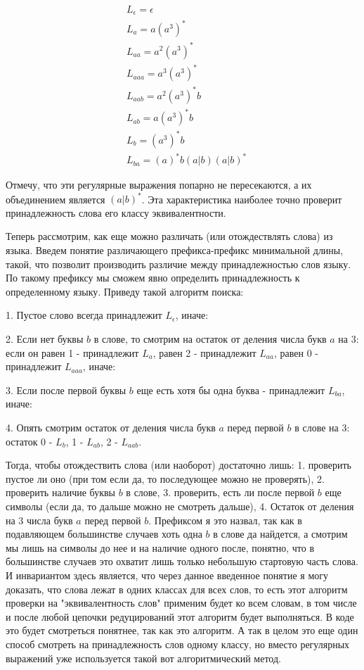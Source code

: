 \documentclass{article}
\begin{document}
\begin{align*}
&L_{\epsilon} = \epsilon \\
&L_a = a(a^3)^* \\
&L_{aa} = a^2(a^3)^* \\
&L_{aaa} = a^3(a^3)^* \\
&L_{aab} = a^2(a^3)^*b \\
&L_{ab} = a(a^3)^*b \\
&L_b = (a^3)^*b \\
&L_{ba} = (a)^*b(a|b)(a|b)^*
\end{align*}

Отмечу, что эти регулярные выражения попарно не пересекаются, а их объединением является $(a|b)^*$. Эта характеристика наиболее точно проверит принадлежность слова его классу эквивалентности.

Теперь рассмотрим, как еще можно различать (или отождествлять слова) из языка. Введем понятие различающего префикса-префикс минимальной длины, такой, что позволит производить различие между принадлежностью слов языку. По такому префиксу мы сможем явно определить принадлежность к определенному языку. Приведу такой алгоритм поиска:

1. Пустое слово всегда принадлежит $L_{\epsilon}$, иначе:

2. Если нет буквы $b$ в слове, то смотрим на остаток от деления числа букв $a$ на 3: если он равен 1 - принадлежит $L_a$, равен 2 - принадлежит $L_{aa}$, равен 0 - принадлежит $L_{aaa}$, иначе:

3. Если после первой буквы $b$ еще есть хотя бы одна буква - принадлежит $L_{ba}$, иначе:

4. Опять смотрим остаток от деления числа букв $a$ перед первой $b$ в слове на 3: остаток 0 - $L_b$, 1 - $L_{ab}$, 2 - $L_{aab}$.

Тогда, чтобы отождествить слова (или наоборот) достаточно лишь: 1. проверить пустое ли оно (при том если да, то последующее можно не проверять), 2. проверить наличие буквы $b$ в слове, 3. проверить, есть ли после первой $b$ еще символы (если да, то дальше можно не смотреть дальше), 4. Остаток от деления на 3 числа букв $a$ перед первой $b$. Префиксом я это назвал, так как в подавляющем большинстве случаев хоть одна $b$ в слове да найдется, а смотрим мы лишь на символы до нее и на наличие одного после, понятно, что в большинстве случаев это охватит лишь только небольшую стартовую часть слова. И инвариантом здесь является, что через данное введенное понятие я могу доказать, что слова лежат в одних классах для всех слов, то есть этот алгоритм проверки на "эквивалентность слов" применим будет ко всем словам, в том числе и после любой цепочки редуцирований этот алгоритм будет выполняться. В коде это будет смотреться понятнее, так как это алгоритм. А так в целом это еще один способ смотреть на принадлежность слов одному классу, но вместо регулярных выражений уже используется такой вот алгоритмический метод.
\end{document}
